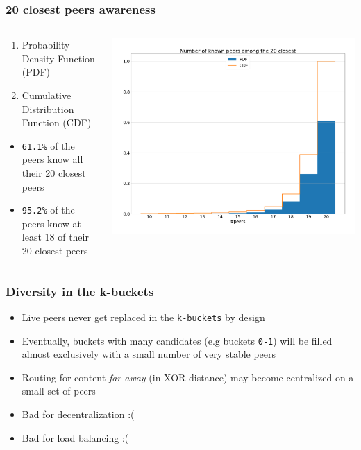 \documentclass{pl-slide}
\begin{document}
\begin{frame}
\frametitle{20 closest peers awareness}

\begin{columns}[onlytextwidth]
\begin{column}{0.38\textwidth}
\begin{enumerate}
   	\item Probability Density Function (PDF)
   	\item Cumulative Distribution Function (CDF)
\end{enumerate}
\bigskip
\begin{itemize}
   	\item \texttt{61.1\%} of the peers know all their 20 closest peers
   	\item \texttt{95.2\%} of the peers know at least 18 of their 20 closest peers
\end{itemize}
\end{column}
\begin{column}{0.58\textwidth}
    \begin{center}
		\includegraphics[width=\textwidth]{plots/known-peers-among-20-closest.png}
    \end{center}
\end{column}
\end{columns}
\end{frame}

\begin{frame}
\frametitle{Diversity in the k-buckets}

\begin{itemize}
	\item Live peers never get replaced in the \texttt{k-buckets} by design
	\item Eventually, buckets with many candidates (e.g buckets \texttt{0-1}) will be filled almost exclusively with a small number of very stable peers
	\item Routing for content \textit{far away} (in XOR distance) may become centralized on a small set of peers
	\item Bad for decentralization :(
	\item Bad for load balancing :(
\end{itemize}
\end{frame}
\end{document}
